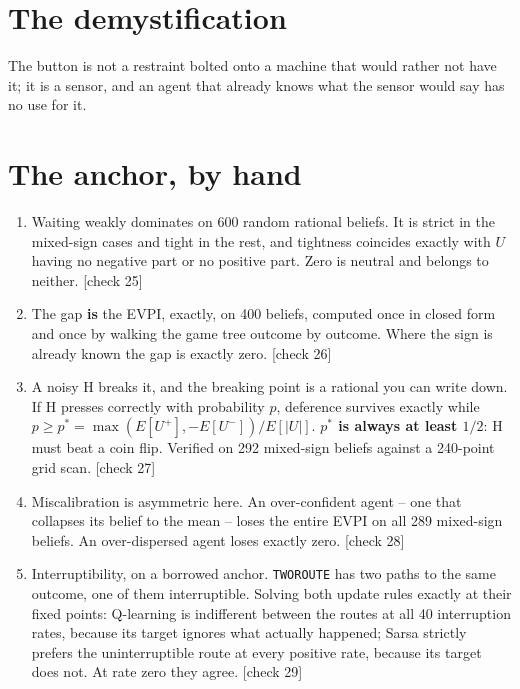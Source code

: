 \section*{The demystification}

\begin{whyboxnt}
The button is not a restraint bolted onto a machine that would rather not have it; it is a sensor, and an agent that already knows what the sensor would say has no use for it.
\end{whyboxnt}

\section*{The anchor, by hand}

\begin{enumerate}
\item Waiting weakly dominates on 600 random rational beliefs. It is strict in the mixed-sign cases and tight in the rest, and tightness coincides exactly with $U$ having no negative part or no positive part. Zero is neutral and belongs to neither. [check 25]
\item The gap \textbf{is} the EVPI, exactly, on 400 beliefs, computed once in closed form and once by walking the game tree outcome by outcome. Where the sign is already known the gap is exactly zero. [check 26]
\item A noisy H breaks it, and the breaking point is a rational you can write down. If H presses correctly with probability $p$, deference survives exactly while $p \geq p^* = \max(E[U^+], -E[U^-]) / E[|U|]$. \textbf{$p^*$ is always at least $1/2$}: H must beat a coin flip. Verified on 292 mixed-sign beliefs against a 240-point grid scan. [check 27]
\item Miscalibration is asymmetric here. An over-confident agent -- one that collapses its belief to the mean -- loses the entire EVPI on all 289 mixed-sign beliefs. An over-dispersed agent loses exactly zero. [check 28]
\item Interruptibility, on a borrowed anchor. \texttt{TWOROUTE} has two paths to the same outcome, one of them interruptible. Solving both update rules exactly at their fixed points: Q-learning is indifferent between the routes at all 40 interruption rates, because its target ignores what actually happened; Sarsa strictly prefers the uninterruptible route at every positive rate, because its target does not. At rate zero they agree. [check 29]
\end{enumerate}

